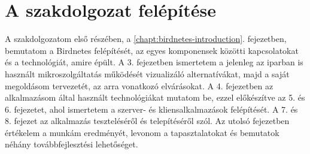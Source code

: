 \section{A szakdolgozat felépítése}
A szakdolgozatom első részében, a \ref{chapt:birdnetes-introduction}. fejezetben, bemutatom a Birdnetes felépítését, az egyes komponensek közötti kapcsolatokat és a technológiát, amire épült.
A 3. fejezetben ismertetem a jelenleg az iparban is használt mikroszolgáltatás működését vizualizáló alternatívákat, majd a saját megoldásom tervezetét, az arra vonatkozó elvárásokat.
A 4. fejezetben az alkalmazásom által használt technológiákat mutatom be, ezzel előkészítve az 5. és 6. fejezetet, ahol ismertetem a szerver- és kliensalkalmazások felépítését.
A 7. és 8. fejezet az alkalmazás teszteléséről és telepítéséről szól.
Az utolsó fejezetben értékelem a munkám eredményét, levonom a tapasztalatokat és bemutatok néhány továbbfejlesztési lehetőséget.